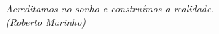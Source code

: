 \begin{epigrafe}
  \vspace*{\fill}
  \begin{flushright}
    \textit{Acreditamos no sonho e construímos a realidade.} \\
    \textit{(Roberto Marinho)}
  \end{flushright}
\end{epigrafe}
